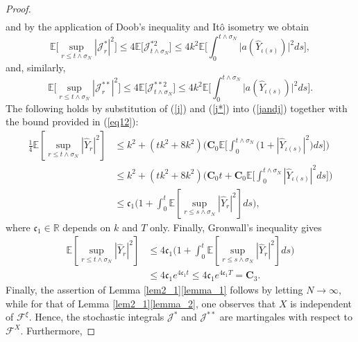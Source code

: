 \begin{proof}
\begin{multline}
\end{multline}
and by the application of Doob's inequality and It\^o isometry we obtain
\begin{equation}\label{j}
    \mathbb{E}\big[\sup_{r \leq t  \land \sigma_N}|\mathcal{J}^{*}_r|^2\big] \leq 4 \mathbb{E}\big[\mathcal{J}^{*2}_{t \land \sigma_N}\big] \leq 4 k^2  \mathbb{E}\bigg[\int^{t \land \sigma_N}_{0}\big|a(\hat{Y}_{\iota(s)})\big|^2 ds  \bigg],
\end{equation}
and, similarly,
\begin{equation}\label{j*}
    \mathbb{E}\big[\sup_{r \leq t  \land \sigma_N}|\mathcal{J}^{**}_r|^2\big] \leq 4 \mathbb{E}\big[\mathcal{J}^{**2}_{t \land \sigma_N}\big] \leq 4 k^2  \mathbb{E}\bigg[\int^{t \land \sigma_N}_{0}\big|a(\hat{Y}_{\iota(s)})\big|^2 ds  \bigg].
\end{equation}
The following holds by substitution of (\ref{j}) and (\ref{j*}) into (\ref{jandj}) together with the bound provided in (\ref{eq12}):
\begin{equation}
    \begin{aligned}
        \frac{1}{4} \mathbb{E}[\sup_{r \leq t  \land \sigma_N}|\hat{Y}_r|^2]
        &\leq k^2 + (tk^2 + 8k^2)\bigg(\mathbf{C}_0 \mathbb{E}\bigg[ \int^{t \land \sigma_N}_{0} \big( 1 + |\hat{Y}_{\iota(s)}|^2 \big)ds \bigg]\bigg)\\
        &\leq k^2 + (tk^2 + 8k^2)\bigg( \mathbf{C}_0 t + \mathbf{C}_0 \mathbb{E}\bigg[ \int^{t \land \sigma_N}_{0}  |\hat{Y}_{\iota(s)}|^2 ds \bigg] \bigg)\\
        &\leq \mathfrak{c}_1 \bigg(1 + \int^{t}_{0}\mathbb{E}[\sup_{r \leq s  \land \sigma_N}|\hat{Y}_r|^2]ds \bigg),
    \end{aligned}
\end{equation}
where $\mathfrak{c}_1 \in \mathbb{R}$ depends on $k$ and $T$ only. Finally, Gronwall's inequality gives
\begin{equation*}
    \begin{aligned}
        \mathbb{E}[\sup_{r \leq t  \land \sigma_N}|\hat{Y}_r|^2] &\leq 4 \mathfrak{c}_1 \bigg(1 + \int^{t}_{0}\mathbb{E}[\sup_{r \leq s  \land \sigma_N}|\hat{Y}_r|^2]ds \bigg)\\
        &\leq 4\mathfrak{c}_1e^{4\mathfrak{c}_1t} \leq 4\mathfrak{c}_1e^{4\mathfrak{c}_1T} = \mathbf{C}_3.
    \end{aligned}
\end{equation*}
Finally, the assertion of Lemma \ref{lem2_1}\ref{lemma_1} follows by letting $N \to \infty$, while for that of Lemma \ref{lem2_1}\ref{lemma_2}, one observes that $X$ is independent of $\mathcal{F}^{\xi}$. Hence, the stochastic integrals $\mathcal{J}^{*}$ and $\mathcal{J}^{**}$  are martingales with respect to $\mathcal{F}^{X}$. Furthermore,

\end{proof}
